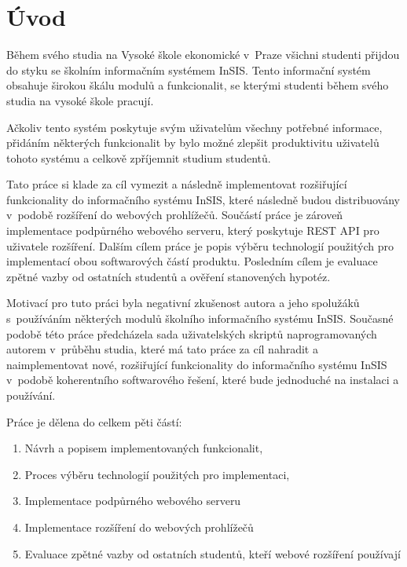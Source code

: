\chapter*{Úvod}

Během svého studia na Vysoké škole ekonomické v~Praze všichni studenti přijdou do styku se školním informačním systémem InSIS. Tento informační systém obsahuje širokou škálu modulů a funkcionalit, se kterými studenti během svého studia na vysoké škole pracují.

Ačkoliv tento systém poskytuje svým uživatelům všechny potřebné informace, přidáním některých funkcionalit by bylo možné zlepšit produktivitu uživatelů tohoto systému a celkově zpříjemnit studium studentů.

Tato práce si klade za cíl vymezit a následně implementovat rozšiřující funkcionality do informačního systému InSIS, které následně budou distribuovány v~podobě rozšíření do webových prohlížečů. Součástí práce je zároveň implementace podpůrného webového serveru, který poskytuje REST API pro uživatele rozšíření. Dalším cílem práce je popis výběru technologií použitých pro implementací obou softwarových částí produktu. Posledním cílem je evaluace zpětné vazby od ostatních studentů a ověření stanovených hypotéz.

Motivací pro tuto práci byla negativní zkušenost autora a jeho spolužáků s~používáním některých modulů školního informačního systému InSIS. 
Současné podobě této práce předcházela sada uživatelských skriptů naprogramovaných autorem v~průběhu studia, které má tato práce za cíl nahradit a naimplementovat nové, rozšiřující funkcionality do informačního systému InSIS v~podobě koherentního softwarového řešení, které bude jednoduché na instalaci a používání.

Práce je dělena do celkem pěti částí: 

\begin{enumerate}
    \item Návrh a popisem implementovaných funkcionalit,
    \item Proces výběru technologií použitých pro implementaci,
    \item Implementace podpůrného webového serveru
    \item Implementace rozšíření do webových prohlížečů
    \item Evaluace zpětné vazby od ostatních studentů, kteří webové rozšíření používají
\end{enumerate}

